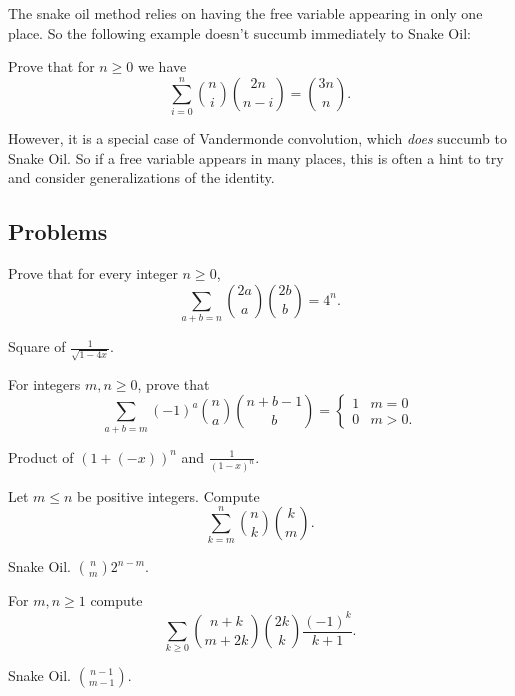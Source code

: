 \documentclass[11pt]{scrartcl}
\begin{document}
The snake oil method relies on having the free variable appearing in only one place.
So the following example doesn't succumb immediately to Snake Oil:
\begin{tcolorbox}[plainbox]
  Prove that for $n \ge 0$ we have
  \[ \sum_{i=0}^n \binom ni \binom{2n}{n-i} = \binom{3n}{n}. \]
\end{tcolorbox}
However, it is a special case of Vandermonde convolution,
which \emph{does} succumb to Snake Oil.
So if a free variable appears in many places,
this is often a hint to try and consider generalizations of the identity.

\subsection{Problems}
\begin{problem}
  Prove that for every integer $n \ge 0$,
  \[ \sum_{a+b=n} \binom{2a}{a} \binom{2b}{b} = 4^n. \]
  \begin{hint}
    Square of $\frac{1}{\sqrt{1-4x}}$.
  \end{hint}
\end{problem}

\begin{problem}
  For integers $m,n \ge 0$, prove that
  \[ \sum_{a+b=m} (-1)^a \binom na \binom{n+b-1}{b} =
    \begin{cases}
      1 & m = 0 \\
      0 & m > 0.
    \end{cases}
  \]
  \begin{hint}
    Product of $(1+(-x))^n$ and $\frac{1}{(1-x)^n}$.
  \end{hint}
\end{problem}

\begin{problem}
  Let $m \le n$ be positive integers.
  Compute \[ \sum_{k=m}^n \binom nk \binom km.  \]
  \begin{hint}
    Snake Oil. $\binom nm 2^{n-m}$.
  \end{hint}
\end{problem}

\begin{problem}
  For $m,n \ge 1$ compute
  \[ \sum_{k \ge 0} \binom{n+k}{m+2k}
    \binom{2k}{k} \frac{(-1)^k}{k+1}. \]
  \begin{hint}
    Snake Oil. $\binom{n-1}{m-1}$.
  \end{hint}
\end{problem}
\end{document}
